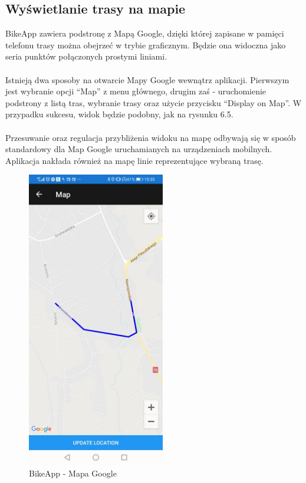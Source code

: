 \subsection{Wyświetlanie trasy na mapie} %
BikeApp zawiera podstronę z Mapą Google, dzięki której zapisane w pamięci telefonu trasy można obejrzeć w trybie graficznym. Będzie ona widoczna jako seria punktów połączonych prostymi liniami.\\
\\
Istnieją dwa sposoby na otwarcie Mapy Google wewnątrz aplikacji. Pierwszym jest wybranie opcji ``Map'' z menu głównego, drugim zaś - uruchomienie podstrony z listą tras, wybranie trasy oraz użycie przycisku ``Display on Map''. W przypadku sukcesu, widok będzie podobny, jak na rysunku 6.5.\\
\\
Przesuwanie oraz regulacja przybliżenia widoku na mapę odbywają się w sposób standardowy dla Map Google uruchamianych na urządzeniach mobilnych. Aplikacja nakłada również na mapę linie reprezentujące wybraną trasę.

\begin{figure}[!htb]
	\begin{center}
		\includegraphics[width=6cm]{rys/instructions-map.jpg}
		\caption{BikeApp - Mapa Google}
		\label{rys:BikeApp - Mapa Google}
	\end{center}
\end{figure}

